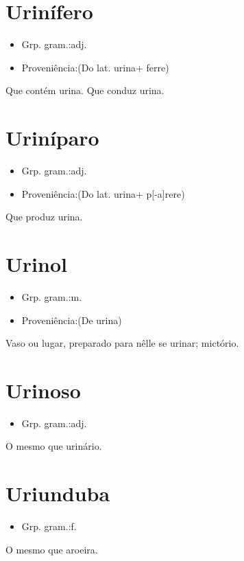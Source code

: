 \documentclass{article}
\begin{document}
\section{Urinífero}
\begin{itemize}
\item {Grp. gram.:adj.}
\end{itemize}
\begin{itemize}
\item {Proveniência:(Do lat. \textunderscore urina\textunderscore  + \textunderscore ferre\textunderscore )}
\end{itemize}
Que contém urina.
Que conduz urina.
\section{Uriníparo}
\begin{itemize}
\item {Grp. gram.:adj.}
\end{itemize}
\begin{itemize}
\item {Proveniência:(Do lat. \textunderscore urina\textunderscore  + \textunderscore p[-a]rere\textunderscore )}
\end{itemize}
Que produz urina.
\section{Urinol}
\begin{itemize}
\item {Grp. gram.:m.}
\end{itemize}
\begin{itemize}
\item {Proveniência:(De \textunderscore urina\textunderscore )}
\end{itemize}
Vaso ou lugar, preparado para nêlle se urinar; mictório.
\section{Urinoso}
\begin{itemize}
\item {Grp. gram.:adj.}
\end{itemize}
O mesmo que \textunderscore urinário\textunderscore .
\section{Uriunduba}
\begin{itemize}
\item {Grp. gram.:f.}
\end{itemize}
O mesmo que \textunderscore aroeira\textunderscore .
\end{document}
